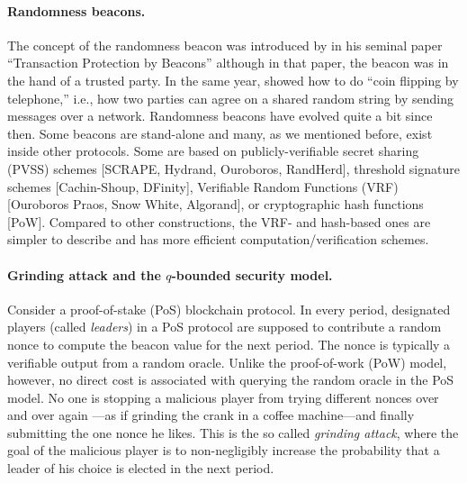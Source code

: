 
\paragraph{Randomness beacons.}
The concept of the randomness beacon was introduced by \citet{rabin-beacon} in his seminal paper 
``Transaction Protection by Beacons'' although in that paper, the beacon was in the hand of a trusted party.
In the same year, 
\citet{blum-coin-flipping} showed how to do ``coin flipping by telephone,'' i.e., 
how two parties can agree on a shared random string by sending messages over a network. 
Randomness beacons have evolved quite a bit since then. 
Some beacons are stand-alone and many, as we mentioned before, exist inside other protocols. 
Some are based on publicly-verifiable secret sharing (PVSS) schemes [SCRAPE, Hydrand, Ouroboros, RandHerd], 
threshold signature schemes [Cachin-Shoup, DFinity],  
Verifiable Random Functions (VRF) [Ouroboros Praos, Snow White, Algorand], 
or cryptographic hash functions [PoW]. 
Compared to other constructions, the VRF- and hash-based ones are simpler to describe and has 
more efficient computation/verification schemes. 


\paragraph{Grinding attack and the $q$-bounded security model.}
Consider a proof-of-stake (PoS) blockchain protocol. 
In every period, designated players (called \emph{leaders}) in a PoS protocol 
are supposed to contribute a random nonce to compute the beacon value for the next period. 
The nonce is typically a verifiable output from a random oracle.
Unlike the proof-of-work (PoW) model, however, no direct cost is associated with querying the random oracle in the PoS model. 
No one is stopping a malicious player from trying different nonces over and over again 
---as if grinding the crank in a coffee machine---and finally submitting the one nonce he likes. 
This is the so called \emph{grinding attack}, where the goal of the malicious player is to 
non-negligibly increase the probability that a leader of his choice is elected in the next period. 

